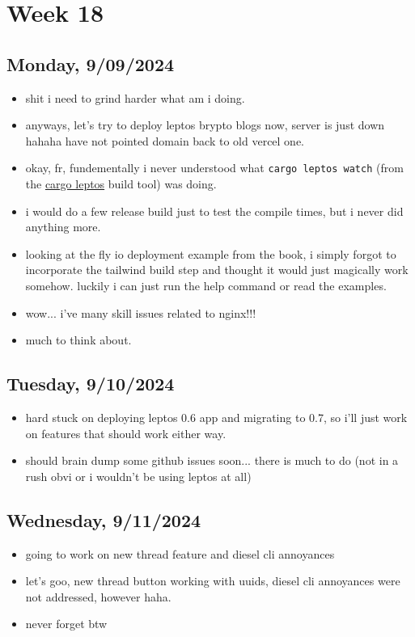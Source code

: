 \newpage
\section{Week 18}

\subsection*{Monday, 9/09/2024}
\begin{itemize}
    \item shit i need to grind harder what am i doing.
    \item anyways, let's try to deploy leptos brypto blogs now, server is just
        down hahaha have not pointed domain back to old vercel one.
    \item okay, fr, fundementally i never understood what \texttt{cargo leptos
        watch} (from the  
        \textcolor{blue}{\href{https://github.com/leptos-rs/cargo-leptos}{cargo leptos}}
        build tool) was doing.
    \item i would do a few release build just to test the compile times, but i
        never did anything more.
    \item looking at the fly io deployment example from the book, i simply
        forgot to incorporate the tailwind build step and thought it would just
        magically work somehow. luckily i can just run the help command or read
        the examples.
    \item wow... i've many skill issues related to nginx!!!
    \item much to think about.
\end{itemize}

\subsection*{Tuesday, 9/10/2024}
\begin{itemize}
    \item hard stuck on deploying leptos 0.6 app and migrating to 0.7, so i'll
        just work on features that should work either way.
    \item should brain dump some github issues soon... there is much to do (not 
        in a rush obvi or i wouldn't be using leptos at all)
\end{itemize}

\subsection*{Wednesday, 9/11/2024}
\begin{itemize}
    \item going to work on new thread feature and diesel cli annoyances
    \item let's goo, new thread button working with uuids, diesel cli annoyances
        were not addressed, however haha.
    \item never forget btw
\end{itemize}
